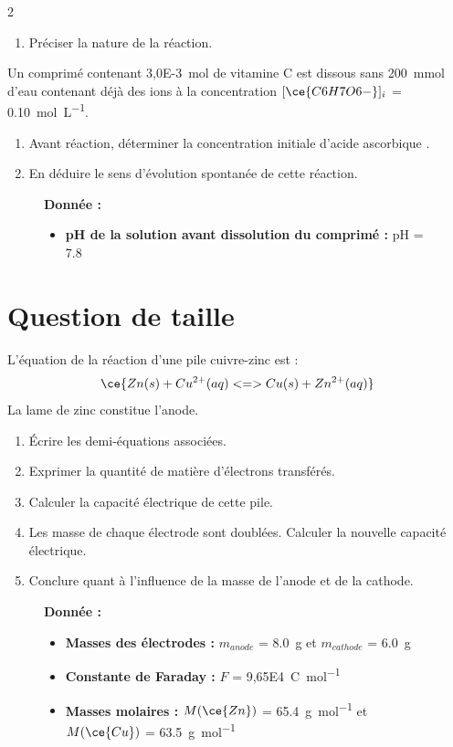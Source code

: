\documentclass[a4paper,11pt,fleqn]{article}%
\begin{document}
\begin{multicols}{2}
\begin{enumerate}
    \item Préciser la nature de la réaction.
\end{enumerate}
Un comprimé contenant \SI{3,0E-3}{\mole} de vitamine C est dissous sans \SI{200}{\milli\mole} d'eau contenant déjà des ions  à la concentration $[\ce{C6H7O6-}]_i$ = \SI{0,10}{\mole\per\liter}.
\begin{enumerate}[resume]
    \item Avant réaction, déterminer la concentration initiale d'acide ascorbique .
    \item En déduire le sens d'évolution spontanée de cette réaction.
\end{enumerate}
\begin{figure}[H]
    \begin{minipage}{\linewidth}
    \textbf{Donnée :}
    \begin{itemize}
        \item \textbf{pH de la solution avant dissolution du comprimé :} pH = \num{7,8}
    \end{itemize}
    \end{minipage}
\end{figure}

\section{Question de taille}
L'équation de la réaction d'une pile cuivre-zinc est :
$$\ce{Zn(s) + Cu^{2+}(aq) <=> Cu(s) + Zn^{2+}(aq)}$$
La lame de zinc constitue l'anode.
\begin{enumerate}
    \item Écrire les demi-équations associées.
    \item Exprimer la quantité de matière d'électrons transférés.
    \item Calculer la capacité électrique de cette pile.
    \item Les masse de chaque électrode sont doublées. Calculer la nouvelle capacité électrique.
    \item Conclure quant à l'influence de la masse de l'anode et de la cathode.
\end{enumerate}
\begin{figure}[H]
    \begin{minipage}{\linewidth}
    \textbf{Donnée :}
    \begin{itemize}
        \item \textbf{Masses des électrodes :} $m_{anode}$ = \SI{8,0}{\gram} et $m_{cathode}$ = \SI{6,0}{\gram}
        \item \textbf{Constante de Faraday :} $F$ = \SI{9,65E4}{\coulomb\per\mole}
        \item \textbf{Masses molaires :} $M(\ce{Zn})$ = \SI{65,4}{\gram\per\mole} et $M(\ce{Cu})$ = \SI{63,5}{\gram\per\mole}
    \end{itemize}
    \end{minipage}
\end{figure}


\end{multicols}
\end{document}
